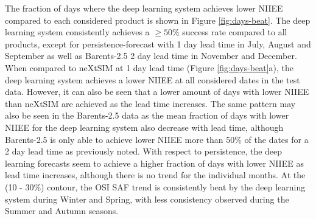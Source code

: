 \documentclass[../main/thesis.tex]{subfiles}
\begin{document}
The fraction of days where the deep learning system achieves lower NIIEE compared to each considered product is shown in Figure \ref{fig:days-beat}. The deep learning system consistently achieves a $\geq50\%$ success rate compared to all products, except for persistence-forecast with 1 day lead time in July, August and September as well as Barents-2.5 2 day lead time in November and December. When compared to neXtSIM at 1 day lead time (Figure \ref{fig:days-beat}a), the deep learning system achieves a lower NIIEE at all considered dates in the test data. However, it can also be seen that a lower amount of days with lower NIIEE than neXtSIM are achieved as the lead time increases. The same pattern may also be seen in the Barents-2.5 data as the mean fraction of days with lower NIIEE for the deep learning system also decrease with lead time, although Barents-2.5 is only able to achieve lower NIIEE more than 50\% of the dates for a 2 day lead time as previously noted. With respect to persistence, the deep learning forecasts seem to achieve a higher fraction of days with lower NIIEE as lead time increases, although there is no trend for the individual months. At the (10 - 30\%) contour, the OSI SAF trend is consistently beat by the deep learning system during Winter and Spring, with less consistency observed during the Summer and Autumn seasons.
\end{document}
